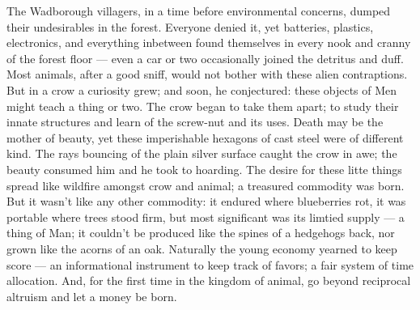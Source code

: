 The Wadborough villagers, in a time before environmental concerns, dumped their undesirables in the forest. Everyone denied it, yet batteries, plastics, electronics, and everything inbetween found themselves in every nook and cranny of the forest floor — even a car or two occasionally joined the detritus and duff. Most animals, after a good sniff, would not bother with these alien contraptions. But in a crow a curiosity grew; and soon, he conjectured: these objects of Men might teach a thing or two. The crow began to take them apart; to study their innate structures and learn of the screw-nut and its uses. Death may be the mother of beauty, yet these imperishable hexagons of cast steel were of different kind. The rays bouncing of the plain silver surface caught the crow in awe; the beauty consumed him and he took to hoarding. The desire for these litte things spread like wildfire amongst crow and animal; a treasured commodity was born. But it wasn't like any other commodity: it endured where blueberries rot, it was portable where trees stood firm, but most significant was its limtied supply — a thing of Man; it couldn't be produced like the spines of a hedgehogs back, nor grown like the acorns of an oak. Naturally the young economy yearned to keep score — an informational instrument to keep track of favors; a fair system of time allocation. And, for the first time in the kingdom of animal, go beyond reciprocal altruism and let a money be born.




